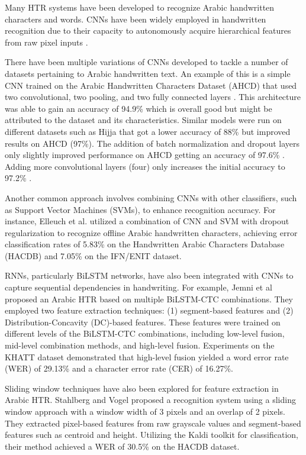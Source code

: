 \documentclass[conference]{IEEEtran}
\begin{document}
Many HTR systems have been developed to recognize Arabic handwritten characters and words. CNNs have been widely employed in handwritten recognition due to their capacity to autonomously acquire hierarchical features from raw pixel inputs \cite{}.

There have been multiple variations of CNNs developed to tackle a number of datasets pertaining to Arabic handwritten text. An example of this is a simple CNN trained on the Arabic Handwritten Characters Dataset (AHCD) that used two convolutional, two pooling, and two fully connected layers \cite{el2017arabic}. This architecture was able to gain an accuracy of 94.9\% which is overall good but might be attributed to the dataset and its characteristics. Similar models were run on different datasets such as Hijja \cite{altwaijry2021arabic} that got a lower accuracy of 88\% but improved results on AHCD (97\%). The addition of batch normalization and dropout layers only slightly improved performance on AHCD getting an accuracy of 97.6\% \cite{younis2017arabic}. Adding more convolutional layers (four) only increases the initial accuracy to 97.2\% \cite{najadat2019arabic}. 


Another common approach involves combining CNNs with other classifiers, such as Support Vector Machines (SVMs), to enhance recognition accuracy. For instance, Elleuch et al. \cite{elleuch2016new} utilized a combination of CNN and SVM with dropout regularization to recognize offline Arabic handwritten characters, achieving error classification rates of 5.83\% on the Handwritten Arabic Characters Database (HACDB) and 7.05\% on the IFN/ENIT dataset.

RNNs, particularly BiLSTM networks, have also been integrated with CNNs to capture sequential dependencies in handwriting. For example, Jemni et al \cite{jemni2017arabic} proposed an Arabic HTR based on multiple BiLSTM-CTC combinations. They employed two feature extraction techniques: (1) segment-based features and (2) Distribution-Concavity (DC)-based features. These features were trained on different levels of the BiLSTM-CTC combinations, including low-level fusion, mid-level combination methods, and high-level fusion. Experiments on the KHATT dataset demonstrated that high-level fusion yielded a word error rate (WER) of 29.13\% and a character error rate (CER) of 16.27\%.

Sliding window techniques have also been explored for feature extraction in Arabic HTR. Stahlberg and Vogel \cite{stahlberg2017} proposed a recognition system using a sliding window approach with a window width of 3 pixels and an overlap of 2 pixels. They extracted pixel-based features from raw grayscale values and segment-based features such as centroid and height. Utilizing the Kaldi toolkit for classification, their method achieved a WER of 30.5\% on the HACDB dataset.
\end{document}
